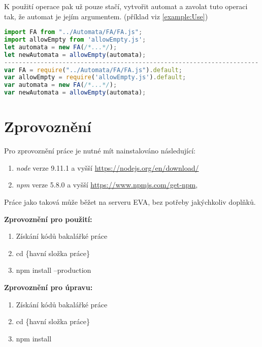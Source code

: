 K použití operace pak už pouze stačí, vytvořit automat a zavolat tuto operaci tak, že automat je jejím argumentem. (příklad viz \ref{example:Use})

\begin{lstlisting}[language=JavaScript,label={example:Use}, caption={ukázka použití operace}]
import FA from "../Automata/FA/FA.js";
import allowEmpty from 'allowEmpty.js';
let automata = new FA(/*...*/);
let newAutomata = allowEmpty(automata);
----------------------------------------------------------------------
var FA = require("../Automata/FA/FA.js").default;
var allowEmpty = require('allowEmpty.js').default;
var automata = new FA(/*...*/);
var newAutomata = allowEmpty(automata);
\end{lstlisting}

\section{Zprovoznění}
Pro zprovoznění práce je nutné mít nainstalováno následující:
\begin{enumerate}
	\item \textit{node} verze 9.11.1 a vyšší \url{https://nodejs.org/en/download/}
	\item \textit{npm} verze 5.8.0 a vyšší \url{https://www.npmjs.com/get-npm}, 
\end{enumerate}
Práce jako taková může běžet na serveru EVA, bez potřeby jakýchkoliv doplňků.


\textbf{Zprovoznění pro použití:}
\begin{enumerate}
	\item Získání kódů bakalářké práce
	\item cd \{havní složka práce\}
	\item npm install --production
\end{enumerate}
\textbf{Zprovoznění pro úpravu:}
\begin{enumerate}
	\item Získání kódů bakalářké práce
	\item cd \{havní složka práce\}
	\item npm install
\end{enumerate}


